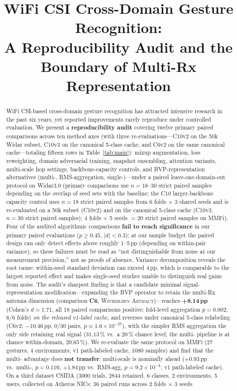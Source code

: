 \documentclass[journal,11pt]{IEEEtran}
\title{WiFi CSI Cross-Domain Gesture Recognition:\\
       A Reproducibility Audit and the Boundary of Multi-Rx Representation}
\author{\IEEEauthorblockN{Wang~Lei}
        \IEEEauthorblockA{\textit{School of Computer Science and Technology}\\
        \textit{Dianchi College}\\
        Kunming, Yunnan, China\\
        Email: 20242100136@dcc.edu.cn\\
        ORCID: \href{https://orcid.org/0009-0003-3371-6056}{0009-0003-3371-6056}}
}
\newcommand{\Rx}{\text{Rx}}
\begin{document}
\maketitle

\begin{abstract}
WiFi CSI-based cross-domain gesture recognition has attracted intensive research in the past six years, yet reported improvements rarely reproduce under controlled evaluation. We present a \textbf{reproducibility audit} covering twelve primary paired comparisons across ten method axes (with three re-evaluations---C10v2 on the 50k Widar subset, C10v3 on the canonical 5-class cache, and C6v2 on the same canonical cache---totaling fifteen rows in Table~\ref{tab:main}): mixup augmentation, loss reweighting, domain adversarial training, snapshot ensembling, attention variants, multi-scale hop settings, backbone-capacity controls, and BVP-representation alternatives (multi-\Rx, RMS-aggregation, single-\Rx)---under a paired leave-one-domain-out protocol on Widar3.0 (primary comparisons use $n = 18$--$30$ strict paired samples depending on the overlap of seed sets with the baseline; the C10 larger-backbone capacity control uses $n = 18$ strict paired samples from 6 folds $\times$ 3 shared seeds and is re-evaluated on a 50k subset (C10v2) and on the canonical 5-class cache (C10v3, $n = 30$ strict paired samples); 4 folds $\times$ 5 seeds $= 20$ strict paired samples on MMFi). Four of the audited algorithmic comparisons \textbf{fail to reach significance} in our primary paired evaluations ($p \geq 0.45$, $|d| < 0.3$); at our sample budget the paired design can only detect effects above roughly 1--5\,pp (depending on within-pair variance), so these failures must be read as ``not distinguishable from noise at our measurement precision,'' not as proofs of absence. Variance decomposition reveals the root cause: within-seed standard deviation can exceed 4\,pp, which is comparable to the largest reported effect and makes single-seed studies unable to distinguish real gains from noise. The audit's sharpest finding is that a candidate minimal signal-representation modification---expanding the BVP operator to retain the multi-Rx antenna dimension (comparison \textbf{C6}, \textsc{Withdrawn Artifact})---reaches \textbf{+8.14\,pp} (Cohen's $d = 1.71$, all 18 paired comparisons positive; fold-level aggregation $p = 0.002$, 6/6 folds) \emph{on the released v1-label cache}, and reverses under canonical 5-class relabeling (C6v2: $-10.46$\,pp, $0/30$ pairs, $p \approx 1.6 \times 10^{-27}$), with the simpler RMS aggregation the only side retaining real signal ($31.13\,\%$ vs.\ a $20\,\%$ chance level; the multi-\Rx{} pipeline is at chance within-domain, $20.65\,\%$). We re-evaluate the same protocol on MMFi (27 gestures, 4 environments; v1 path-labeled cache, 1080 samples) and find that the multi-\Rx{} advantage does \textbf{not transfer}: multi-scale is nominally ahead ($+0.93$\,pp vs.\ multi-\Rx, $p = 0.116$; $+1.84$\,pp vs.\ RMS-agg, $p = 9.2\times10^{-4}$; v1 path-labeled cache). On a third dataset CSIDA (3000 trials, 2844 retained, 6 classes, 2 environments, 5 users, collected on Atheros NICs; 36 paired runs across 2 folds $\times$ 3 seeds 
\end{abstract}
\end{document}
